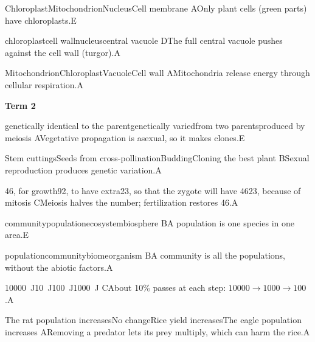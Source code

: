 \begin{gradebody}
{Chloroplast}{Mitochondrion}{Nucleus}{Cell membrane}
{A}{Only plant cells (green parts) have chloroplasts.}{E}

{chloroplast}{cell wall}{nucleus}{central vacuole}
{D}{The full central vacuole pushes against the cell wall (turgor).}{A}

{Mitochondrion}{Chloroplast}{Vacuole}{Cell wall}
{A}{Mitochondria release energy through cellular respiration.}{A}

\textbf{Term 2}

{genetically identical to the parent}{genetically varied}{from two parents}{produced by meiosis}
{A}{Vegetative propagation is asexual, so it makes clones.}{E}

{Stem cuttings}{Seeds from cross-pollination}{Budding}{Cloning the best plant}
{B}{Sexual reproduction produces genetic variation.}{A}

{46, for growth}{92, to have extra}{23, so that the zygote will have 46}{23, because of mitosis}
{C}{Meiosis halves the number; fertilization restores 46.}{A}

{community}{population}{ecosystem}{biosphere}
{B}{A population is one species in one area.}{E}

{population}{community}{biome}{organism}
{B}{A community is all the populations, without the abiotic factors.}{A}

{\SI{10000}{J}}{\SI{10}{J}}{\SI{100}{J}}{\SI{1000}{J}}
{C}{About 10\% passes at each step: $10000 \rightarrow 1000 \rightarrow 100$.}{A}

{The rat population increases}{No change}{Rice yield increases}{The eagle population increases}
{A}{Removing a predator lets its prey multiply, which can harm the rice.}{A}


\end{gradebody}
